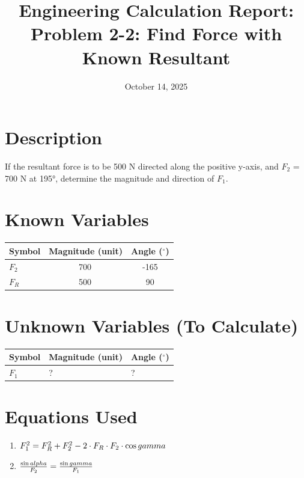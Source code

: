 \documentclass[11pt,a4paper]{article}
\title{Engineering Calculation Report: Problem 2-2: Find Force with Known Resultant}
\date{October 14, 2025}
\begin{document}
\maketitle

\section*{Description}
\noindent
\begin{minipage}{\textwidth}
If the resultant force is to be 500 N directed along the positive y-axis, and $F_{2}$ = 700 N at 195°, determine the magnitude and direction of $F_{1}$.
\end{minipage}
\par

\section{Known Variables}

\begin{longtable}{lSS}
\toprule
Symbol & {Magnitude (unit)} & {Angle ($^\circ$)} \\
\midrule
\endhead
$F_{2}$ & 700\, & -165 \\
$F_{R}$ & 500\, & 90 \\
\bottomrule
\end{longtable}

\section{Unknown Variables (To Calculate)}

\begin{longtable}{lll}
\toprule
Symbol & Magnitude (unit) & Angle ($^\circ$) \\
\midrule
\endhead
$F_{1}$ & ? & ? \\
\bottomrule
\end{longtable}

\section{Equations Used}

\begin{enumerate}
\item $\Large F_{1}^{2} = F_{R}^{2} + F_{2}^{2} - 2 \cdot F_R \cdot F_2 \cdot \cos{gamma}$
\item $\Large \frac{\sin{alpha}}{F_2} = \frac{\sin{gamma}}{F_1}$
\end{enumerate}
\end{document}
